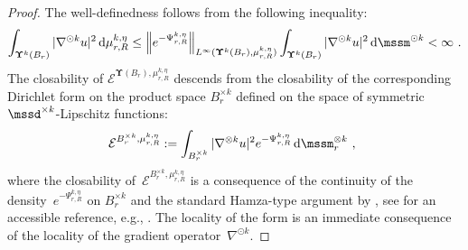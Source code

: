 \documentclass[11pt,letterpaper]{amsart}
\newcommand{\diff}{\mathop{}\!\mathrm{d}}
\newcommand{\comma}{\,\,\mathrm{,}\;\,}
\newcommand{\fstop}{\,\,\mathrm{.}}
\newcommand{\dUpsilon}{{\mathbf \Upsilon}}
\newcommand{\U}{\dUpsilon}
\newcommand{\E}{\mathcal E}
\renewcommand{\1}{\mathbf 1}
\numberwithin{equation}{section}
\theoremstyle{plain}
\theoremstyle{definition}
\theoremstyle{remark}
\begin{document}
\begin{proof}
The well-definedness follows from the following inequality:
\begin{align} \label{eq:form2}
 \int_{\U^k(B_r)} |\nabla^{\odot k} u|^2 \diff \mu_{r, R}^{k, \eta} \le\Bigl\|e^{-\Psi_{r, R}^{k, \eta}}\Bigr\|_{L^\infty(\U^k(B_r), \mu_{r, R}^{k, \eta})}\int_{\U^k(B_r)} |\nabla^{\odot k} u|^2 \diff \mssm^{\odot k}<\infty \fstop
\end{align}
The closability of $\E^{\U(B_r), \mu_{r, R}^{k, \eta}}$ descends from the closability of the corresponding Dirichlet form on the product space $B_r^{\times k}$ defined on the space of symmetric $\mssd^{\times k}$-Lipschitz functions:  
$$\E^{B_r^{\times k}, \mu_{r, R}^{k, \eta}}:=\int_{B_r^{\times k}} |\nabla^{\otimes k} u|^2 e^{-\Psi_{r, R}^{k, \eta}} \diff \mssm^{\otimes k}_{r}\comma$$
where the closability of~$\E^{B_r^{\times k}, \mu_{r, R}^{k, \eta}}$ is a consequence of the continuity of the density~$e^{-\Psi_{r, R}^{k, \eta}}$ on $B_r^{\times k}$ and the standard Hamza-type argument by \cite{RoeWie85, Fuk97}, see for an accessible reference, e.g., \cite[pp.\ 44-45]{MaRoe90}. The locality of the form is an immediate consequence of the locality of the gradient operator~$\nabla^{\odot k}$.
\end{proof}
\end{document}

